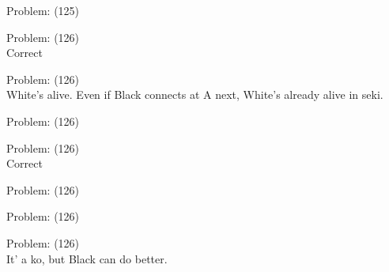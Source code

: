 \documentclass[11pt]{article}
\begin{document}
\begin{minipage}[t]{0.5\textwidth}
  {\centering
  
Problem: (125)\\
  }
\end{minipage}
\begin{minipage}[t]{0.5\textwidth}
  {\centering
  
Problem: (126)\\
Correct\\
  }
\end{minipage}
\begin{minipage}[t]{0.5\textwidth}
  {\centering
  
Problem: (126)\\
White's alive. Even if Black connects at A next, White's already alive in seki.\\
  }
\end{minipage}
\begin{minipage}[t]{0.5\textwidth}
  {\centering
  
Problem: (126)\\
  }
\end{minipage}
\begin{minipage}[t]{0.5\textwidth}
  {\centering
  
Problem: (126)\\
Correct\\
  }
\end{minipage}
\begin{minipage}[t]{0.5\textwidth}
  {\centering
  
Problem: (126)\\
  }
\end{minipage}
\begin{minipage}[t]{0.5\textwidth}
  {\centering
  
Problem: (126)\\
  }
\end{minipage}
\begin{minipage}[t]{0.5\textwidth}
  {\centering
  
Problem: (126)\\
It' a ko, but Black can do better.\\
  }
\end{minipage}
\end{document}
